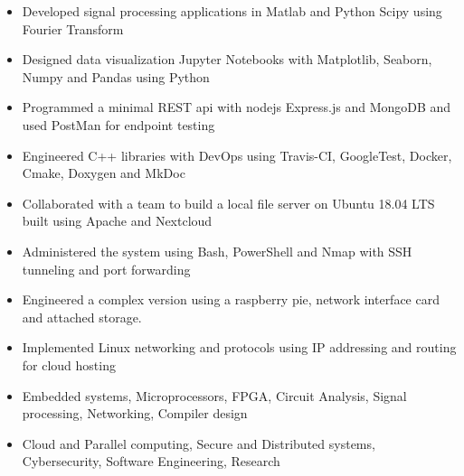 \documentclass[11pt,a4paper,ragged2e]{altacv}
\begin{document}
\begin{paracol}{1}
\begin{itemize}
\item Developed signal processing applications in Matlab and Python Scipy using Fourier Transform 
\item Designed data visualization Jupyter Notebooks with Matplotlib, Seaborn, Numpy and Pandas using Python
\item Programmed a minimal REST api with nodejs Express.js and MongoDB and used PostMan for endpoint testing
\item Engineered C++ libraries with DevOps using Travis-CI, GoogleTest, Docker, Cmake, Doxygen and MkDoc
\end{itemize}
\tightdivider

\begin{itemize}
\item Collaborated with a team to build a local file server on Ubuntu 18.04 LTS built using Apache and Nextcloud
\item Administered the system using Bash, PowerShell and Nmap with SSH tunneling and port forwarding
\item Engineered a complex version using a raspberry pie, network interface card and attached storage.
\item Implemented Linux networking and protocols using IP addressing and routing for cloud hosting
\end{itemize}

\medskip

\begin{itemize}
\item Embedded systems, Microprocessors, FPGA, Circuit Analysis, Signal processing, Networking,  Compiler design
\item Cloud and Parallel computing, Secure and Distributed systems, Cybersecurity, Software Engineering, Research
\end{itemize}



\end{paracol}
\end{document}
